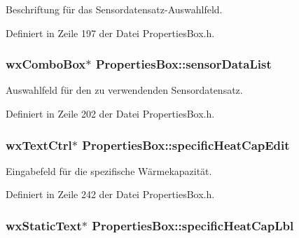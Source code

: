 Beschriftung für das Sensordatensatz-\/\-Auswahlfeld. 



Definiert in Zeile 197 der Datei Properties\-Box.\-h.

\hypertarget{classPropertiesBox_afc9329945c39f48e441c410b0ff3d9fa}{
\subsubsection[{sensor\-Data\-List}]{\setlength{\rightskip}{0pt plus 5cm}wx\-Combo\-Box$\ast$ Properties\-Box\-::sensor\-Data\-List\hspace{0.3cm}{\ttfamily [private]}}}\label{classPropertiesBox_afc9329945c39f48e441c410b0ff3d9fa}


Auswahlfeld für den zu verwendenden Sensordatensatz. 



Definiert in Zeile 202 der Datei Properties\-Box.\-h.

\hypertarget{classPropertiesBox_a7058b344520a2d9ba42fe9e9c1080faa}{
\subsubsection[{specific\-Heat\-Cap\-Edit}]{\setlength{\rightskip}{0pt plus 5cm}wx\-Text\-Ctrl$\ast$ Properties\-Box\-::specific\-Heat\-Cap\-Edit\hspace{0.3cm}{\ttfamily [private]}}}\label{classPropertiesBox_a7058b344520a2d9ba42fe9e9c1080faa}


Eingabefeld für die spezifische Wärmekapazität. 



Definiert in Zeile 242 der Datei Properties\-Box.\-h.

\hypertarget{classPropertiesBox_ad49b95cb856e5f18d6717fc99ccd7b0b}{
\subsubsection[{specific\-Heat\-Cap\-Lbl}]{\setlength{\rightskip}{0pt plus 5cm}wx\-Static\-Text$\ast$ Properties\-Box\-::specific\-Heat\-Cap\-Lbl\hspace{0.3cm}{\ttfamily [private]}}}\label{classPropertiesBox_ad49b95cb856e5f18d6717fc99ccd7b0b}


